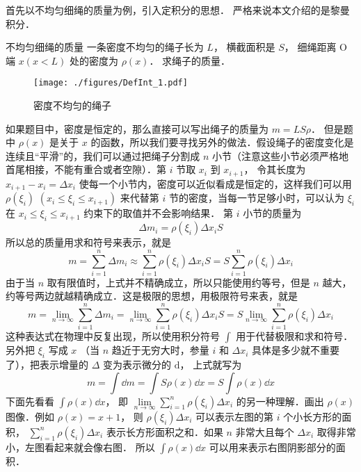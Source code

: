 

首先以不均匀细绳的质量为例，引入定积分的思想． 严格来说本文介绍的是黎曼积分．

\begin{example}{不均匀细绳的质量}\label{DefInt_ex1}
一条密度不均匀的绳子长为 $L$， 横截面积是 $S$， 细绳距离 O 端 $x (x<L) $ 处的密度为 $\rho(x)$． 求绳子的质量．

\begin{figure}[ht]
\centering
\texttt{[image: ./figures/DefInt\_1.pdf]}
\caption{密度不均匀的绳子}
\end{figure}

如果题目中，密度是恒定的，那么直接可以写出绳子的质量为 $m = LS\rho$． 但是题中 $\rho(x)$ 是关于 $x$ 的函数，所以我们要寻找另外的做法．假设绳子的密度变化是连续且“平滑”的，我们可以通过把绳子分割成 $n$ 小节（注意这些小节必须严格地首尾相接，不能有重合或者空隙）．第 $i$ 节取 $x_i$ 到 $x_{i +1}$， 令其长度为 $x_{i + 1} - {x_i} = \Delta x_i$ 使每一个小节内，密度可以近似看成是恒定的，这样我们可以用 $\rho(\xi_i)\,\, (x_i \leqslant \xi_i \leqslant x_{i + 1})$ 来代替第 $i$ 节的密度，当每一节足够小时，可以认为 $\xi_i$ 在 $x_i \leqslant \xi_i \leqslant x_{i + 1}$ 约束下的取值并不会影响结果． 第 $i$ 小节的质量为
\begin{equation}
\Delta {m_i} = \rho (\xi_i)\Delta {x_i}S 
\end{equation}
所以总的质量用求和符号来表示，就是
\begin{equation}
m = \sum_{i = 1}^n \Delta m_i  \approx \sum_{i = 1}^n \rho(\xi_i)\Delta x_i S   = S \sum_{i = 1}^n \rho (\xi_i)\Delta x_i
\end{equation}
由于当 $n$ 取有限值时，上式并不精确成立，所以只能使用约等号，但是 $n$ 越大，约等号两边就越精确成立．这是极限的思想，用极限符号来表，就是
\begin{equation}
m = \lim_{n \to \infty } \sum_{i = 1}^n {\Delta {m_i}}  = \lim_{n \to \infty } \sum_{i = 1}^n \rho(\xi_i)\Delta {x_i}S   = S   \lim_{n \to \infty } \sum_{i = 1}^n \rho(\xi_i)\Delta {x_i}
\end{equation}
这种表达式在物理中反复出现，所以使用积分符号 $\int {} $ 用于代替极限和求和符号．另外把 ${\xi_i}$ 写成 $x$ （当 $n$ 趋近于无穷大时，参量 $i$ 和 $\Delta {x_i}$ 具体是多少就不重要了），把表示增量的 $\Delta $ 变为表示微分的 $\mathrm{d}$， 上式就写为
\begin{equation}
m = \int \dd{m}  = \int S\rho(x) \dd{x}  = S\int \rho(x) \dd{x}
\end{equation}
下面先看看 $\int \rho(x) \dd{x}$， 即 $\lim\limits_{n \to \infty } \sum\limits_{i = 1}^n \rho(\xi_i)\Delta {x_i}$ 的另一种理解．画出 $\rho (x)$ 图像．例如 $\rho(x) = x + 1$， 则 $\rho(\xi_i)\Delta {x_i}$ 可以表示左图的第 $i$ 个小长方形的面积， $\sum\limits_{i = 1}^n \rho(\xi_i)\Delta x_i$ 表示长方形面积之和．如果 $n$ 非常大且每个 $\Delta x_i$ 取得非常小，左图看起来就会像右图． 所以 $\int \rho(x) \dd{x}$ 可以用来表示右图阴影部分的面积．


\end{example}
